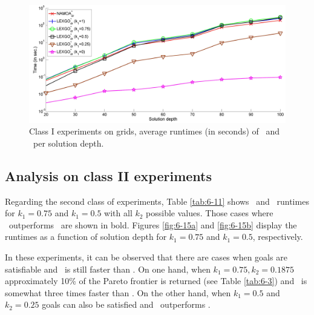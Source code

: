 \begin{figure}%
\centering
\includegraphics[width=1\textwidth]{Images/Chapter6/class1-exe-time-te}
\caption{Class I experiments on grids, average runtimes (in seconds) of \namoate \ and \lexgote \ per solution depth.}
\label{fig:6-14}
\end{figure}

\subsection{Analysis on class II experiments}
\label{chapEmpiricalAnalysis:subsec:analysisgridsfinalc2}

Regarding the second class of experiments, Table \ref{tab:6-11} shows \namoate \ and \lexgote \ runtimes for $k_1=0.75$ and $k_1=0.5$ with all $k_2$ possible values. Those cases where \lexgote \ outperforms \namoate \ are shown in bold. Figures \ref{fig:6-15a} and \ref{fig:6-15b} display the runtimes as a function of solution depth for $k_1=0.75$ and $k_1=0.5$, respectively. 

In these experiments, it can be observed that there are cases when goals are satisfiable and \lexgote \ is still faster than \namoate. On one hand, when $k_1=0.75, k_2=0.1875$ approximately 10\% of the Pareto frontier is returned (see Table \ref{tab:6-3}) and \lexgote \ is somewhat three times faster than \namoate. On the other hand, when $k_1=0.5$ and $k_2=0.25$ goals can also be satisfied and \lexgote \ outperforms \namoate. 

